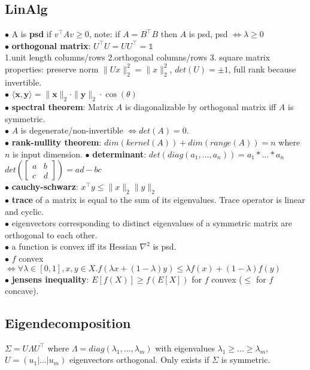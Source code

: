 \subsection*{LinAlg}
$\bullet$ A is \textbf{psd} if $v^\top Av \geq 0$, note: if $A=B^\top B$ then $A$ is psd, psd $\Leftrightarrow \lambda \geq 0$ \\
$\bullet$ \textbf{orthogonal matrix}: $U^\top U = UU^\top = \mathbb{1}$ \\
1.unit length columns/rows 2.orthogonal columns/rows 3. square matrix \\
properties: preserve norm $\|Ux\|_2^2 = \|x\|_2^2$, $det(U) = \pm1$, full rank because invertible.\\
$\bullet$ $\langle \mathbf{x}, \mathbf{y} \rangle = \|\mathbf{x}\|_2 \cdot \|\mathbf{y}\|_2 \cdot \cos(\theta)$ \\
$\bullet$ \textbf{spectral theorem}: Matrix $A$ is diagonalizable by orthogonal matrix iff $A$ is symmetric. \\
$\bullet$ $A$ is degenerate/non-invertible $\Leftrightarrow det(A)=0$. \\
$\bullet$ \textbf{rank-nullity theorem}: $dim(kernel(A))+dim(range(A)) = n$ where $n$ is input dimension.
$\bullet$ \textbf{determinant}: $det(diag(a_1,...,a_n))=a_1*...*a_n$ \quad $det(\begin{bmatrix}a & b \\c&d\end{bmatrix})=ad-bc$ \\
$\bullet$ \textbf{cauchy-schwarz}: $x^\top y \leq \|x\|_2 \|y\|_2$ \\
$\bullet$ \textbf{trace} of a matrix is equal to the sum of its eigenvalues. Trace operator is linear and cyclic. \\
$\bullet$ eigenvectors corresponding to distinct eigenvalues of a symmetric matrix are orthogonal to each other. \\
$\bullet$ a function is convex iff its Hessian $\nabla^2$ is psd.\\
$\bullet$ $f$ convex $\Leftrightarrow \forall \lambda \in [0,1], x,y \in X. f(\lambda x + (1- \lambda)y) \leq \lambda f(x) + (1 - \lambda) f(y)$\\
$\bullet$ \textbf{jensens inequality}: $E[f(X)] \geq f(E[X])$ for $f$ convex ($\leq$ for $f$ concave). \\

\subsection*{Eigendecomposition}
$\Sigma = U\Lambda U^\top$ where $\Lambda=diag(\lambda_1,...,\lambda_m)$ with eigenvalues $\lambda_1 \geq...\geq\lambda_m$, $U=(u_1|...|u_m)$ eigenvectors orthogonal. Only exists if $\Sigma$ is symmetric.

